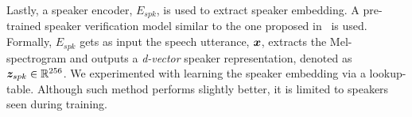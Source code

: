 {} 
\label{sec:spkr}
Lastly, a speaker encoder, $E_{spk}$, is used to extract speaker embedding. A pre-trained speaker verification model similar to the one proposed in~\cite{heigold2016end} is used. Formally, $E_{spk}$ gets as input the speech utterance, $\bm{x}$, extracts the Mel-spectrogram and outputs a \emph{d-vector} speaker representation, denoted as $\bm{z}_{spk} \in \mathbb{R}^{256}$. We experimented with learning the speaker embedding via a lookup-table. Although such method performs slightly better, it is limited to speakers seen during training.


